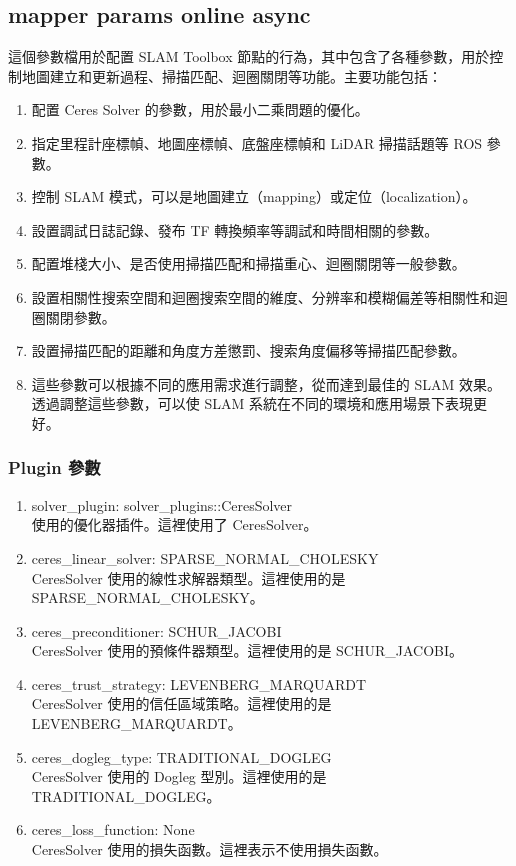 \subsection{mapper params online async}
這個參數檔用於配置 SLAM Toolbox 節點的行為，其中包含了各種參數，用於控制地圖建立和更新過程、掃描匹配、迴圈關閉等功能。主要功能包括：

\begin{enumerate}
    \item 配置 Ceres Solver 的參數，用於最小二乘問題的優化。
    \item 指定里程計座標幀、地圖座標幀、底盤座標幀和 LiDAR 掃描話題等 ROS 參數。
    \item 控制 SLAM 模式，可以是地圖建立（mapping）或定位（localization）。
    \item 設置調試日誌記錄、發布 TF 轉換頻率等調試和時間相關的參數。
    \item 配置堆棧大小、是否使用掃描匹配和掃描重心、迴圈關閉等一般參數。
    \item 設置相關性搜索空間和迴圈搜索空間的維度、分辨率和模糊偏差等相關性和迴圈關閉參數。
    \item 設置掃描匹配的距離和角度方差懲罰、搜索角度偏移等掃描匹配參數。
    \item 這些參數可以根據不同的應用需求進行調整，從而達到最佳的 SLAM 效果。透過調整這些參數，可以使 SLAM 系統在不同的環境和應用場景下表現更好。
\end{enumerate}
\subsubsection{Plugin 參數}
\begin{enumerate}
    \item solver\_plugin: solver\_plugins::CeresSolver
    \\使用的優化器插件。這裡使用了 CeresSolver。
    \item ceres\_linear\_solver: SPARSE\_NORMAL\_CHOLESKY
    \\CeresSolver 使用的線性求解器類型。這裡使用的是 SPARSE\_NORMAL\_CHOLESKY。
    \item ceres\_preconditioner: SCHUR\_JACOBI
    \\CeresSolver 使用的預條件器類型。這裡使用的是 SCHUR\_JACOBI。
    \item ceres\_trust\_strategy: LEVENBERG\_MARQUARDT
    \\CeresSolver 使用的信任區域策略。這裡使用的是 LEVENBERG\_MARQUARDT。
    \item ceres\_dogleg\_type: TRADITIONAL\_DOGLEG
    \\CeresSolver 使用的 Dogleg 型別。這裡使用的是 TRADITIONAL\_DOGLEG。
    \item ceres\_loss\_function: None
    \\CeresSolver 使用的損失函數。這裡表示不使用損失函數。
\end{enumerate}

